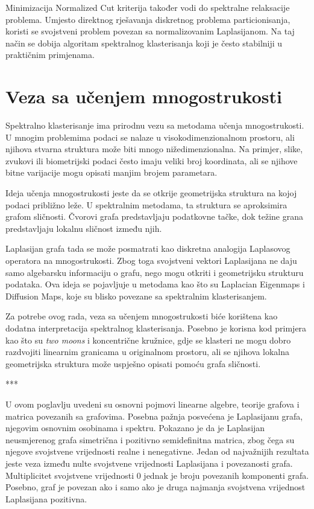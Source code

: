 Minimizacija Normalized Cut kriterija također vodi do spektralne relaksacije problema. Umjesto direktnog rješavanja diskretnog problema particionisanja, koristi se svojstveni problem povezan sa normalizovanim Laplasijanom. Na taj način se dobija algoritam spektralnog klasterisanja koji je često stabilniji u praktičnim primjenama.

\section{Veza sa učenjem mnogostrukosti}
Spektralno klasterisanje ima prirodnu vezu sa metodama učenja mnogostrukosti. U mnogim problemima podaci se nalaze u visokodimenzionalnom prostoru, ali njihova stvarna struktura može biti mnogo nižedimenzionalna. Na primjer, slike, zvukovi ili biometrijski podaci često imaju veliki broj koordinata, ali se njihove bitne varijacije mogu opisati manjim brojem parametara.

Ideja učenja mnogostrukosti jeste da se otkrije geometrijska struktura na kojoj podaci približno leže. U spektralnim metodama, ta struktura se aproksimira grafom sličnosti. Čvorovi grafa predstavljaju podatkovne tačke, dok težine grana predstavljaju lokalnu sličnost između njih.

Laplasijan grafa tada se može posmatrati kao diskretna analogija Laplasovog operatora na mnogostrukosti. Zbog toga svojstveni vektori Laplasijana ne daju samo algebarsku informaciju o grafu, nego mogu otkriti i geometrijsku strukturu podataka. Ova ideja se pojavljuje u metodama kao što su Laplacian Eigenmaps i Diffusion Maps, koje su blisko povezane sa spektralnim klasterisanjem.

Za potrebe ovog rada, veza sa učenjem mnogostrukosti biće korištena kao dodatna interpretacija spektralnog klasterisanja. Posebno je korisna kod primjera kao što su \textit{two moons} i koncentrične kružnice, gdje se klasteri ne mogu dobro razdvojiti linearnim granicama u originalnom prostoru, ali se njihova lokalna geometrijska struktura može uspješno opisati pomoću grafa sličnosti.

\begin{center}
\vspace{0.5cm}
*\hspace{2cm}*\hspace{2cm}*
\vspace{0.3cm}
\end{center}

U ovom poglavlju uvedeni su osnovni pojmovi linearne algebre, teorije grafova i matrica povezanih sa grafovima. Posebna pažnja posvećena je Laplasijanu grafa, njegovim osnovnim osobinama i spektru. Pokazano je da je Laplasijan neusmjerenog grafa simetrična i pozitivno semidefinitna matrica, zbog čega su njegove svojstvene vrijednosti realne i nenegativne.
Jedan od najvažnijih rezultata jeste veza između nulte svojstvene vrijednosti Laplasijana i povezanosti grafa. Multiplicitet svojstvene vrijednosti \(0\) jednak je broju povezanih komponenti grafa. Posebno, graf je povezan ako i samo ako je druga najmanja svojstvena vrijednost Laplasijana pozitivna.

